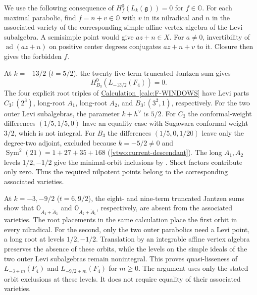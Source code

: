 \documentclass[11pt,a4paper]{amsart}
\numberwithin{equation}{section}
\theoremstyle{definition}
\theoremstyle{remark}
\newcommand{\g}{\mathfrak g}
\newcommand{\OO}{\mathbb O}
\newcommand{\ad}{\operatorname{ad}}
\newcommand{\Sym}{\operatorname{Sym}}
\begin{document}
We use the following consequence of $H_f^0(L_k(\g))=0$ for $f\in\OO$.
For each maximal parabolic, find $f=n+v\in\OO$ with $v$ in its nilradical
and $n$ in the associated variety of the corresponding simple affine
vertex algebra of the Levi subalgebra. A semisimple point would give
$az+n\in X$. For $a\ne0$, invertibility of $\ad(az+n)$ on positive
center degrees conjugates $az+n+v$ to it. Closure then gives the forbidden $f$.

At $k=-13/2$ ($t=5/2$), the twenty-five-term truncated Jantzen sum gives
$$
 H^0_{B_3}(L_{-13/2}(F_4))=0.
$$
The four explicit root triples of \hyperref[calc:F-WINDOWS]{Calculation~\ref*{calc:F-WINDOWS}} have Levi
parts $C_3:(2^3)$, long-root $A_1$, long-root $A_2$, and
$B_3:(3^2,1)$, respectively. For the two outer Levi subalgebras, the parameter $k+h^\vee$ is $5/2$.
For $C_3$ the conformal-weight differences $(1/5,1/5,0)$ have an equality case with Sugawara conformal weight
$3/2$, which is not integral. For $B_3$ the differences $(1/5,0,1/20)$ leave
only the degree-two adjoint, excluded because $k=-5/2\ne0$ and
$\Sym^2(21)=1+27+35+168$ (\cref{vtwo:current-descendant}).
The long $A_1,A_2$ levels $1/2,-1/2$ give the minimal-orbit inclusions by
\cite[Proposition~4.7.2]{AAV}. Short factors contribute only zero.
Thus the required nilpotent points belong to the corresponding associated varieties.

At $k=-3,-9/2$ ($t=6,9/2$), the eight- and nine-term truncated Jantzen sums show that
$\OO_{A_1+\widetilde A_1}$ and $\OO_{A_2+\widetilde A_1}$, respectively,
are absent from the associated varieties.
The root placements in the same calculation place the first orbit in
every nilradical. For the second, only the two outer parabolics need
a Levi point, a long root at levels $1/2,-1/2$.
Translation by an integrable affine vertex algebra preserves the absence of these orbits, while the
levels on the simple ideals of the two outer Levi subalgebras remain nonintegral.
This proves quasi-lisseness of $L_{-3+m}(F_4)$ and $L_{-9/2+m}(F_4)$
for $m\ge0$. The argument uses only the stated orbit exclusions at
these levels. It does not require equality of their associated varieties.
\end{document}
